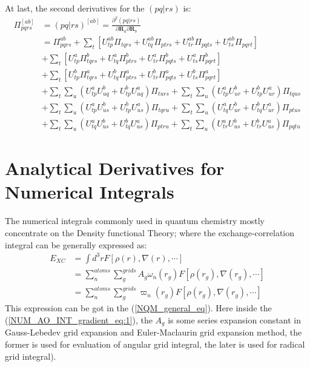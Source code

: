 At last, the second derivatives for the $(pq|rs)$ is:
\begin{equation}
 \begin{split}
  \Pi_{pqrs}^{[ab]} &=(pq|rs)^{[ab]} = \frac{\partial^{2} (pq|rs)}{\partial
\bm{R}_{a}\partial\bm{R}_{b}} \\
&= \Pi^{ab}_{pqrs} + 
\sum_{t} \left[ 
U^{ab}_{tp}\Pi_{tqrs} + 
U^{ab}_{tq}\Pi_{ptrs} +
U^{ab}_{tr}\Pi_{pqts} +
U^{ab}_{ts}\Pi_{pqrt}                      
\right] \\
&+ 
\sum_{t} \left[ 
U^{a}_{tp}\Pi^{b}_{tqrs}  +
U^{a}_{tq}\Pi^{b}_{ptrs}  +
U^{a}_{tr}\Pi^{b}_{pqts}  +
U^{a}_{ts}\Pi^{b}_{pqrt}
\right]  \\
&+
\sum_{t}\left[ 
U^{b}_{tp}\Pi^{a}_{tqrs} +
U^{b}_{tq}\Pi^{a}_{ptrs} + 
U^{b}_{tr}\Pi^{a}_{pqts} + 
U^{b}_{ts}\Pi^{a}_{pqrt}  
\right]  \\
&+
\sum_{t}\sum_{u}
\left(U^{a}_{tp}U^{b}_{uq} + 
U^{b}_{tp}U^{a}_{uq}\right) \Pi_{turs}
+\sum_{t}\sum_{u}
\left(U^{a}_{tp}U^{b}_{ur} + 
U^{b}_{tp}U^{a}_{ur}\right)\Pi_{tqus}   \\ 
&+\sum_{t}\sum_{u}
\left(U^{a}_{tp}U^{b}_{us} +
U^{b}_{tp}U^{a}_{us}\right) \Pi_{tqru}
+\sum_{t}\sum_{u}
\left(U^{a}_{tq}U^{b}_{ur}  +
U^{b}_{tq}U^{a}_{ur}\right)\Pi_{ptus}    \\
&+\sum_{t}\sum_{u}
\left(U^{a}_{tq}U^{b}_{us}  +
U^{b}_{tq}U^{a}_{us}\right)\Pi_{ptru}  
+\sum_{t}\sum_{u}
\left(U^{a}_{tr}U^{b}_{us}  +
U^{b}_{tr}U^{a}_{us}\right)\Pi_{pqtu} 
 \end{split}
 \label{two_electron_MO_INT_gradient_eq:14}
\end{equation}


\section{Analytical Derivatives for Numerical Integrals}
%
%
%
%
The numerical integrals commonly used in quantum chemistry mostly concentrate
on the Density functional Theory; where the exchange-correlation integral can
be generally expressed as:
\begin{equation}
\begin{split}
 E_{XC} &= \int d^{3}r F[\rho(r), \nabla(r), \cdots] \\            
&=\sum_{n}^{atoms}\sum_{g}^{grids}A_{g}\omega_{n}(r_{g})F[\rho(r_{g}),
\nabla(r_{g}), \cdots] \\
&= \sum_{n}^{atoms}\sum_{g}^{grids}\varpi_{n}(r_{g})F[\rho(r_{g}),
\nabla(r_{g}), \cdots]
\end{split}
 \label{NUM_AO_INT_gradient_eq:1} 
\end{equation}
This expression can be got in the (\ref{NQM_general_eq}). Here inside the
(\ref{NUM_AO_INT_gradient_eq:1}), the $A_{g}$ is some series expansion constant
in Gauss-Lebedev grid expansion and Euler-Maclaurin grid expansion method, the
former is used for evaluation of angular grid integral, the later is used for
radical grid integral).

